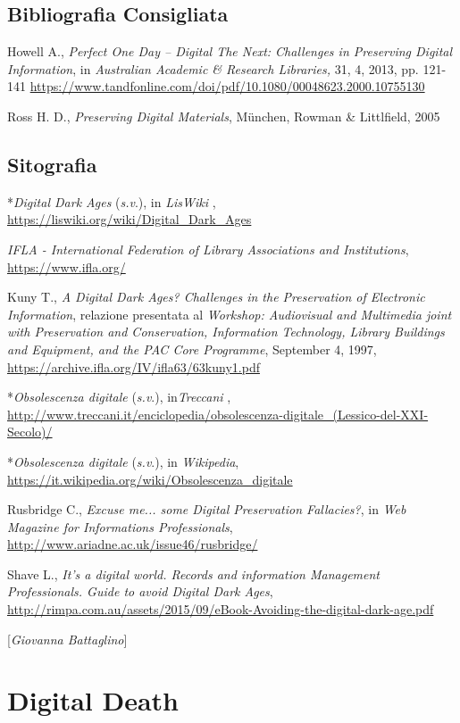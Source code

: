{\section*{Bibliografia Consigliata}
{\parindent0pt 
Howell A., \emph{Perfect One Day -- Digital The Next: Challenges in
Preserving Digital Information}, in \emph{Australian Academic \&
Research Libraries,} 31, 4, 2013, pp. 121-141
\url{https://www.tandfonline.com/doi/pdf/10.1080/00048623.2000.10755130}

Ross H. D., \emph{Preserving Digital Materials}, München, Rowman \&
Littlfield, 2005
}
\section*{Sitografia}
{\parindent0pt 
*\emph{Digital Dark Ages} (\emph{s.v}.), in \emph{LisWiki} ,
\url{https://liswiki.org/wiki/Digital_Dark_Ages}

\emph{IFLA - International Federation of Library Associations and
Institutions},
\url{https://www.ifla.org/}

Kuny T., \emph{A Digital Dark Ages? Challenges in the Preservation of
Electronic Information}, relazione presentata al \emph{Workshop:
Audiovisual and Multimedia joint with Preservation and Conservation,
Information Technology, Library Buildings and Equipment, and the PAC
Core Programme}, September 4, 1997,
\url{https://archive.ifla.org/IV/ifla63/63kuny1.pdf}

*\emph{Obsolescenza digitale} (\emph{s.v}.), in\emph{Treccani} ,
\url{http://www.treccani.it/enciclopedia/obsolescenza-digitale_(Lessico-del-XXI-Secolo)/}


*\emph{Obsolescenza digitale} (\emph{s.v}.), in \emph{Wikipedia},
\url{https://it.wikipedia.org/wiki/Obsolescenza_digitale}


Rusbridge C., \emph{Excuse me... some Digital Preservation Fallacies?},
in \emph{Web Magazine for Informations Professionals},
\url{http://www.ariadne.ac.uk/issue46/rusbridge/}

Shave L., \emph{It's a digital world. Records and information Management
Professionals. Guide to avoid Digital Dark Ages},
\url{http://rimpa.com.au/assets/2015/09/eBook-Avoiding-the-digital-dark-age.pdf}

}

\hrulefill 

{[}\emph{Giovanna Battaglino}{]}



\chapter{Digital Death}

}
